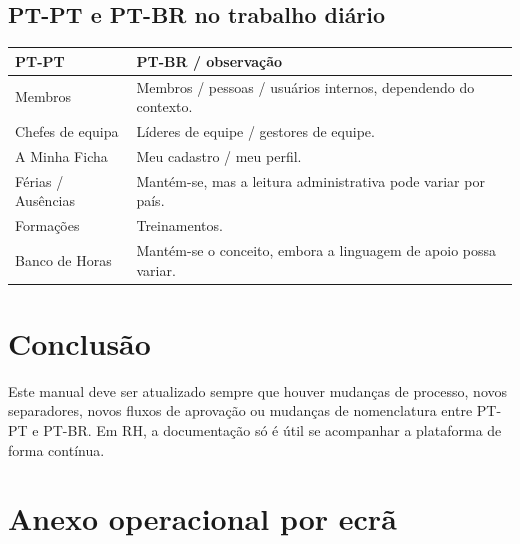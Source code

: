 \section{PT-PT e PT-BR no trabalho diário}
\begin{longtable}{|p{}|p{}|}
\hline
\textbf{PT-PT} & \textbf{PT-BR / observação} \\
\hline
Membros & Membros / pessoas / usuários internos, dependendo do contexto. \\
\hline
Chefes de equipa & Líderes de equipe / gestores de equipe. \\
\hline
A Minha Ficha & Meu cadastro / meu perfil. \\
\hline
Férias / Ausências & Mantém-se, mas a leitura administrativa pode variar por país. \\
\hline
Formações & Treinamentos. \\
\hline
Banco de Horas & Mantém-se o conceito, embora a linguagem de apoio possa variar. \\
\hline
\end{longtable}

\chapter{Conclusão}
Este manual deve ser atualizado sempre que houver mudanças de processo, novos separadores, novos fluxos de aprovação ou mudanças de nomenclatura entre PT-PT e PT-BR. Em RH, a documentação só é útil se acompanhar a plataforma de forma contínua.

\chapter{Anexo operacional por ecrã}
